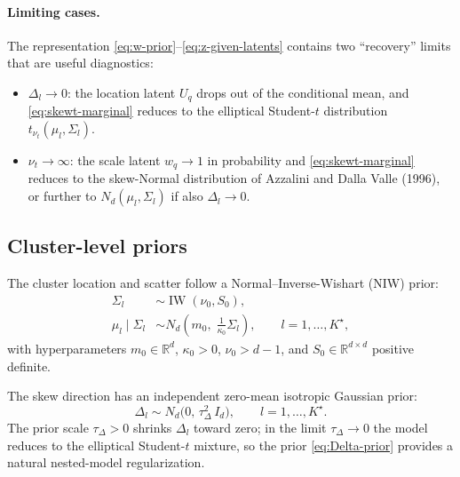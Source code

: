 \documentclass[11pt]{article}
\newcommand{\R}{\mathbb R}
\DeclareMathOperator{\IW}{IW}
\begin{document}
\paragraph{Limiting cases.}
The representation \eqref{eq:w-prior}--\eqref{eq:z-given-latents} contains
two ``recovery'' limits that are useful diagnostics:
\begin{itemize}[leftmargin=1.5em]
    \item $\Delta_l\to 0$:  the location latent $U_q$ drops out of the
    conditional mean, and \eqref{eq:skewt-marginal} reduces to the
    elliptical Student-$t$ distribution $t_{\nu_t}(\mu_l,\Sigma_l)$.
    \item $\nu_t\to\infty$:  the scale latent $w_q\to 1$ in probability and
    \eqref{eq:skewt-marginal} reduces to the skew-Normal distribution of
    Azzalini and Dalla Valle (1996), or further to $N_d(\mu_l,\Sigma_l)$ if
    also $\Delta_l\to 0$.
\end{itemize}

\subsection{Cluster-level priors}

The cluster location and scatter follow a Normal--Inverse-Wishart (NIW)
prior:
\begin{align}
    \Sigma_l
    &\sim\IW(\nu_0,S_0),
    \label{eq:Sigma-prior}\\
    \mu_l\mid\Sigma_l
    &\sim N_d\!\left(m_0,\;\frac{1}{\kappa_0}\Sigma_l\right),
    \qquad l=1,\dots,K^\star,
    \label{eq:mu-prior}
\end{align}
with hyperparameters $m_0\in\R^d$, $\kappa_0>0$, $\nu_0>d-1$, and
$S_0\in\R^{d\times d}$ positive definite.

The skew direction has an independent zero-mean isotropic Gaussian prior:
\begin{equation}
    \Delta_l\sim N_d\!\bigl(0,\,\tau_\Delta^2\,I_d\bigr),
    \qquad l=1,\dots,K^\star.
    \label{eq:Delta-prior}
\end{equation}
The prior scale $\tau_\Delta>0$ shrinks $\Delta_l$ toward zero; in the
limit $\tau_\Delta\to 0$ the model reduces to the elliptical
Student-$t$ mixture, so the prior \eqref{eq:Delta-prior} provides a natural
nested-model regularization.
\end{document}

